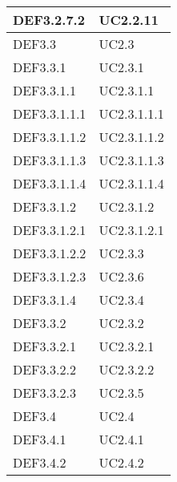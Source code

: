 \documentclass{scalatekids-article}
\begin{document}
\begin{longtable}[H]{|p{5.5cm}|p{5.5cm}|}
\hline
DEF3.2.7.2 & \multiLineCell[t]{UC2.2.11\\}\\
\hline
DEF3.3 & \multiLineCell[t]{UC2.3\\}\\
\hline
DEF3.3.1 & \multiLineCell[t]{UC2.3.1\\}\\
\hline
DEF3.3.1.1 & \multiLineCell[t]{UC2.3.1.1\\}\\
\hline
DEF3.3.1.1.1 & \multiLineCell[t]{UC2.3.1.1.1\\}\\
\hline
DEF3.3.1.1.2 & \multiLineCell[t]{UC2.3.1.1.2\\}\\
\hline
DEF3.3.1.1.3 & \multiLineCell[t]{UC2.3.1.1.3\\}\\
\hline
DEF3.3.1.1.4 & \multiLineCell[t]{UC2.3.1.1.4\\}\\
\hline
DEF3.3.1.2 & \multiLineCell[t]{UC2.3.1.2\\}\\
\hline
DEF3.3.1.2.1 & \multiLineCell[t]{UC2.3.1.2.1\\}\\
\hline
DEF3.3.1.2.2 & \multiLineCell[t]{UC2.3.3\\}\\
\hline
DEF3.3.1.2.3 & \multiLineCell[t]{UC2.3.6\\}\\
\hline
DEF3.3.1.4 & \multiLineCell[t]{UC2.3.4\\}\\
\hline
DEF3.3.2 & \multiLineCell[t]{UC2.3.2\\}\\
\hline
DEF3.3.2.1 & \multiLineCell[t]{UC2.3.2.1\\}\\
\hline
DEF3.3.2.2 & \multiLineCell[t]{UC2.3.2.2\\}\\
\hline
DEF3.3.2.3 & \multiLineCell[t]{UC2.3.5\\}\\
\hline
DEF3.4 & \multiLineCell[t]{UC2.4\\}\\
\hline
DEF3.4.1 & \multiLineCell[t]{UC2.4.1\\}\\
\hline
DEF3.4.2 & \multiLineCell[t]{UC2.4.2\\}\\

\end{longtable}
\end{document}

